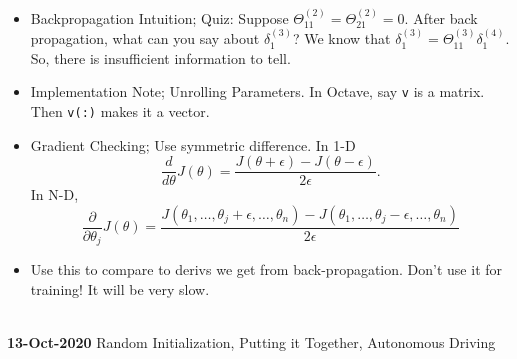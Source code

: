 \documentclass[10pt]{article}
\begin{document}
\begin{itemize}
  \item Backpropagation Intuition; Quiz: Suppose $\Theta_{11}^{(2)} =
    \Theta_{21}^{(2)} = 0$. After back propagation, what can you say
    about $\delta_1^{(3)}$? We know that $\delta_1^{(3)} =
    \Theta_{11}^{(3)} \delta_1^{(4)}$. So, there is insufficient
    information to tell.
  \item Implementation Note; Unrolling Parameters. In Octave, say \texttt{v} is a matrix. Then \texttt{v(:)} makes it a vector.
  \item Gradient Checking; Use symmetric difference. In 1-D
    \begin{equation*}
      \frac{d}{d \theta} J(\theta) = \frac{ J(\theta + \epsilon) - J(\theta - \epsilon) }{2\epsilon}.
    \end{equation*}
  In N-D,
    \begin{equation*}
      \frac{\partial}{\partial \theta_j} J(\theta) = \frac{J( \theta_1, \dots, \theta_j + \epsilon, \dots, \theta_n) - J( \theta_1, \dots, \theta_j - \epsilon, \dots, \theta_n) }{2 \epsilon}
    \end{equation*}
  \item Use this to compare to derivs we get from back-propagation. Don't use it for training! It will be very slow.
\end{itemize}
\hfill \\
{\large \textbf{13-Oct-2020} Random Initialization, Putting it Together, Autonomous Driving}
\end{document}
